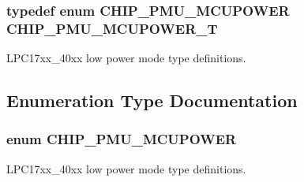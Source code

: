 \subsubsection[{\texorpdfstring{C\+H\+I\+P\+\_\+\+P\+M\+U\+\_\+\+M\+C\+U\+P\+O\+W\+E\+R\+\_\+T}{CHIP_PMU_MCUPOWER_T}}]{\setlength{\rightskip}{0pt plus 5cm}typedef enum {\bf C\+H\+I\+P\+\_\+\+P\+M\+U\+\_\+\+M\+C\+U\+P\+O\+W\+ER}  {\bf C\+H\+I\+P\+\_\+\+P\+M\+U\+\_\+\+M\+C\+U\+P\+O\+W\+E\+R\+\_\+T}}\hypertarget{group__PMU__17XX__40XX_ga724dd269fe2bbc43740331f35c3bf463}{}\label{group__PMU__17XX__40XX_ga724dd269fe2bbc43740331f35c3bf463}


L\+P\+C17xx\+\_\+40xx low power mode type definitions. 



\subsection{Enumeration Type Documentation}
\subsubsection[{\texorpdfstring{C\+H\+I\+P\+\_\+\+P\+M\+U\+\_\+\+M\+C\+U\+P\+O\+W\+ER}{CHIP_PMU_MCUPOWER}}]{\setlength{\rightskip}{0pt plus 5cm}enum {\bf C\+H\+I\+P\+\_\+\+P\+M\+U\+\_\+\+M\+C\+U\+P\+O\+W\+ER}}\hypertarget{group__PMU__17XX__40XX_gae5e1b53b190a2a25a80b4a6e93c55fa5}{}\label{group__PMU__17XX__40XX_gae5e1b53b190a2a25a80b4a6e93c55fa5}


L\+P\+C17xx\+\_\+40xx low power mode type definitions. 

